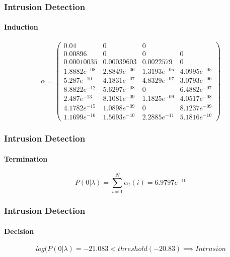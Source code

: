 \documentclass{beamer}
\begin{document}
\begin{frame}
  \frametitle{Intrusion Detection}
  \framesubtitle{Induction}
  $$
  \alpha = 
  \begin{pmatrix} 
    0.04 & 0 & 0 \\
    0.00896 & 0 & 0 & 0\\
    0.00010035 & 0.00039603 & 0.0022579 & 0\\
    1.8882e^{-08} & 2.8849e^{-06} & 1.3193e^{-05} & 4.0995e^{-05}\\
    5.287e^{-10} & 4.1831e^{-07} & 4.8329e^{-07} & 3.0793e^{-06}\\
    8.8822e^{-12} & 5.6297e^{-08}& 0 & 6.4882e^{-07} \\
    2.487e^{-13} & 8.1081e^{-09} & 1.1825e^{-09} & 4.0517e^{-08}\\
    4.1782e^{-15} & 1.0898e^{-09} & 0& 8.1237e^{-09}\\
    1.1699e^{-16} & 1.5693e^{-10} & 2.2885e^{-11} & 5.1816e^{-10}
  \end{pmatrix}
  $$
\end{frame}
\begin{frame}
  \frametitle{Intrusion Detection}
  \framesubtitle{Termination}
  $$
  P(0|\lambda) = \sum\limits_{i=1}^N \alpha_t(i) = 6.9797e^{-10}
  $$
\end{frame}
\begin{frame}
  \frametitle{Intrusion Detection}
  \framesubtitle{Decision}
  $$
  log(P(0|\lambda) = -21.083 < threshold (-20.83) \implies Intrusion
  $$
\end{frame}
\end{document}
